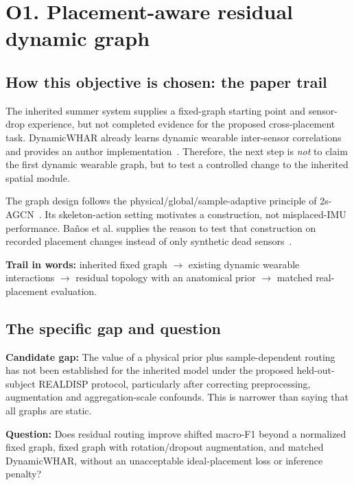 \documentclass[10pt]{article}
\begin{document}
\clearpage
\section*{O1. Placement-aware residual dynamic graph}
\subsection*{How this objective is chosen: the paper trail}
The inherited summer system supplies a fixed-graph starting point and sensor-drop experience, but not completed evidence for the proposed cross-placement task. DynamicWHAR already learns dynamic wearable inter-sensor correlations and provides an author implementation~\cite{omdynamic}. Therefore, the next step is \emph{not} to claim the first dynamic wearable graph, but to test a controlled change to the inherited spatial module.

The graph design follows the physical/global/sample-adaptive principle of 2s-AGCN~\cite{omagcn}. Its skeleton-action setting motivates a construction, not misplaced-IMU performance. Ba\~nos et al. supplies the reason to test that construction on recorded placement changes instead of only synthetic dead sensors~\cite{ombanos}.

\textbf{Trail in words:} inherited fixed graph $\rightarrow$ existing dynamic wearable interactions $\rightarrow$ residual topology with an anatomical prior $\rightarrow$ matched real-placement evaluation.

\subsection*{The specific gap and question}
\textbf{Candidate gap:} The value of a physical prior plus sample-dependent routing has not been established for the inherited model under the proposed held-out-subject REALDISP protocol, particularly after correcting preprocessing, augmentation and aggregation-scale confounds. This is narrower than saying that all graphs are static.

\textbf{Question:} Does residual routing improve shifted macro-F1 beyond a normalized fixed graph, fixed graph with rotation/dropout augmentation, and matched DynamicWHAR, without an unacceptable ideal-placement loss or inference penalty?
\end{document}
